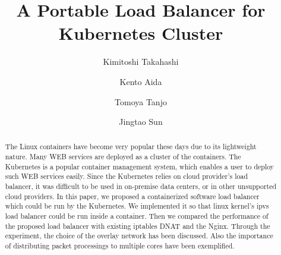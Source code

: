 \documentclass[sigconf]{acmart}
\begin{document}
\title{A Portable Load Balancer for Kubernetes Cluster}

\author{Kimitoshi Takahashi}

\author{Kento Aida}

\author{Tomoya Tanjo}

\author{Jingtao Sun}

\renewcommand{\shortauthors}{K. Takahashi et al.}


\begin{abstract}
The Linux containers have become very popular these days due to its lightweight nature.
Many WEB services are deployed as a cluster of the containers. 
The Kubernetes is a popular container management system, which enables a user to deploy such WEB services easily.
Since the Kubernetes relies on cloud provider's load balancer, 
it was difficult to be used in on-premise data centers, or in other unsupported cloud providers.
In this paper, we proposed a containerized software load balancer which could be run by the Kubernetes.
We implemented it so that linux kernel's ipvs load balancer could be run inside a container.
Then we compared the performance of the proposed load balancer with existing iptables DNAT and the Nginx.
Through the experiment, the choice of the overlay network has been discussed.
Also the importance of distributing packet processings to multiple cores have been exemplified.
\end{abstract}

%
%
\begin{CCSXML}
\end{CCSXML}

\ccsdesc[]{}



\maketitle




 
\end{document}
